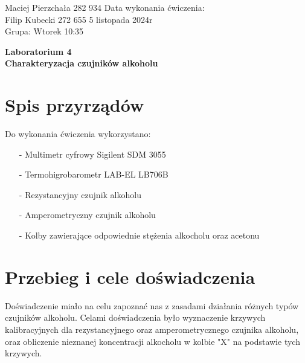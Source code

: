 \documentclass[11pt]{article}
\begin{document}
    \begin{flushleft}
        Maciej Pierzchała 282 934 \hfill Data wykonania ćwiczenia:\\
        Filip Kubecki 272 655 \hfill 5 listopada 2024r\\
        Grupa: Wtorek 10:35 \\
    \end{flushleft}
    \begin{center}
        \Large\textbf{Laboratorium 4}\\
        \textbf{Charakteryzacja czujników alkoholu}
    \end{center}
    \hfill
    \section{Spis przyrządów}
    \par{
        Do wykonania ćwiczenia wykorzystano:
        \begin{itemize}
            \setlength\itemsep{0em}
            \item[-] Multimetr cyfrowy Sigilent SDM 3055
            \item[-] Termohigrobarometr LAB-EL LB706B
            \item[-] Rezystancyjny czujnik alkoholu
            \item[-] Amperometryczny czujnik alkoholu
            \item[-] Kolby zawierające odpowiednie stężenia alkocholu oraz acetonu
        \end{itemize}
    }
    \section{Przebieg i cele doświadczenia}
    \par Doświadczenie miało na celu zapoznać nas z zasadami działania różnych typów czujników alkoholu.
    \indent Celami doświadczenia było wyznaczenie krzywych kalibracyjnych dla rezystancyjnego oraz amperometrycznego czujnika alkoholu,
    oraz obliczenie nieznanej koncentracji alkocholu w kolbie "X" na podstawie tych krzywych.
\end{document}
